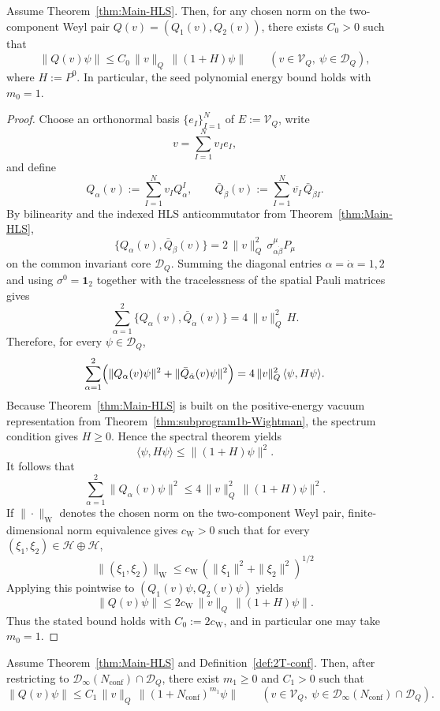 \begin{lemma}
\label{lem:4b-HLS-seed-H-bound}
Assume Theorem~\ref{thm:Main-HLS}. Then, for any chosen norm on the two-component
Weyl pair \(Q(v)=(Q_1(v),Q_2(v))\), there exists \(C_0>0\) such that
\[
\|Q(v)\psi\|
\le
C_0\,\|v\|_Q\,\|(1+H)\psi\|
\qquad
(v\in\mathcal V_Q,\ \psi\in\mathcal D_Q),
\]
where \(H:=P^0\). In particular, the seed polynomial energy bound holds
with \(m_0=1\).
\end{lemma}

\begin{proof}
Choose an orthonormal basis \(\{e_I\}_{I=1}^N\) of \(E:=\mathcal V_Q\), write
\[
v=\sum_{I=1}^N v_I e_I,
\]
and define
\[
Q_\alpha(v):=\sum_{I=1}^N v_I Q_\alpha^I,
\qquad
\bar Q_{\dot\beta}(v):=\sum_{I=1}^N \overline{v_I}\,\bar Q_{\dot\beta I}.
\]
By bilinearity and the indexed HLS anticommutator from
Theorem~\ref{thm:Main-HLS},
\[
\{Q_\alpha(v),\bar Q_{\dot\beta}(v)\}
=
2\,\|v\|_Q^2\,\sigma^\mu_{\alpha\dot\beta}P_\mu
\]
on the common invariant core \(\mathcal D_Q\). Summing the diagonal entries
\(\alpha=\dot\alpha=1,2\) and using \(\sigma^0=\mathbf 1_2\) together with the
tracelessness of the spatial Pauli matrices gives
\[
\sum_{\alpha=1}^2 \{Q_\alpha(v),\bar Q_{\dot\alpha}(v)\}
=
4\,\|v\|_Q^2\,H.
\]
Therefore, for every \(\psi\in\mathcal D_Q\),
\[
\sum_{\alpha=1}^2
\Bigl(
\|Q_\alpha(v)\psi\|^2+\|\bar Q_{\dot\alpha}(v)\psi\|^2
\Bigr)
=
4\,\|v\|_Q^2\,\langle\psi,H\psi\rangle.
\]
Because Theorem~\ref{thm:Main-HLS} is built on the positive-energy vacuum
representation from Theorem~\ref{thm:subprogram1b-Wightman}, the spectrum condition
gives \(H\geq 0\). Hence the spectral theorem yields
\[
\langle\psi,H\psi\rangle
\le
\|(1+H)\psi\|^2.
\]
It follows that
\[
\sum_{\alpha=1}^2 \|Q_\alpha(v)\psi\|^2
\le
4\,\|v\|_Q^2\,\|(1+H)\psi\|^2.
\]
If \(\|\cdot\|_{\mathrm W}\) denotes the chosen norm on the two-component Weyl pair,
finite-dimensional norm equivalence gives \(c_{\mathrm W}>0\) such that for every
\((\xi_1,\xi_2)\in\mathcal H\oplus\mathcal H\),
\[
\|(\xi_1,\xi_2)\|_{\mathrm W}
\le
c_{\mathrm W}\,(\|\xi_1\|^2+\|\xi_2\|^2)^{1/2}
\]
Applying this pointwise to
\((Q_1(v)\psi,Q_2(v)\psi)\) yields
\[
\|Q(v)\psi\|
\le
2c_{\mathrm W}\,\|v\|_Q\,\|(1+H)\psi\|.
\]
Thus the stated bound holds with \(C_0:=2c_{\mathrm W}\), and in particular one may
take \(m_0=1\).
\end{proof}

\begin{lemma}
\label{lem:4b-seed-bounds-to-nconf}
Assume Theorem~\ref{thm:Main-HLS} and Definition~\ref{def:2T-conf}. Then, after
restricting to
\(\mathcal D_\infty(N_{\mathrm{conf}})\cap\mathcal D_Q\), there exist \(m_1\geq 0\)
and \(C_1>0\) such that
\[
\|Q(v)\psi\|
\leq
C_1\,\|v\|_Q\,\|(1+N_{\mathrm{conf}})^{m_1}\psi\|
\qquad
(v\in\mathcal V_Q,\ \psi\in\mathcal D_\infty(N_{\mathrm{conf}})\cap\mathcal D_Q).
\]
\end{lemma}

